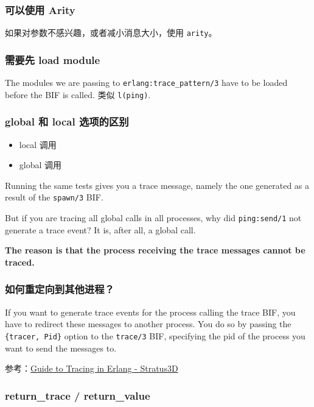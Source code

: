 \documentclass[a4paper,11pt]{article}
\begin{document}
\subsubsection{可以使用 Arity}

如果对参数不感兴趣，或者减小消息大小，使用 \lstinline|arity|。

\subsubsection{需要先 load module}

The modules we are passing to \lstinline|erlang:trace_pattern/3| have to be loaded before the BIF is called. 类似 \lstinline|l(ping)|.

\subsubsection{global 和 local 选项的区别}

\begin{itemize}[leftmargin=1.5em]
    \item local 调用
    \item global 调用
\end{itemize}

Running the same tests gives you a trace message, namely the one generated as a result of the \lstinline|spawn/3| BIF.

But if you are tracing all global calls in all processes, why did \lstinline|ping:send/1| not generate a trace event? It is, after all, a global call.

\textbf{The reason is that the process receiving the trace messages cannot be traced.}

\subsubsection{如何重定向到其他进程？}

If you want to generate trace events for the process calling the trace BIF, you have to redirect these messages to another process. You do so by passing the \lstinline|{tracer, Pid}| option to the \lstinline|trace/3| BIF, specifying the pid of the process you want to send the messages to.

参考：\href{http://stratus3d.com/blog/2021/08/24/guide-to-tracing-in-erlang/}{Guide to Tracing in Erlang - Stratus3D}

\subsubsection{return\_trace / return\_value}
\end{document}
